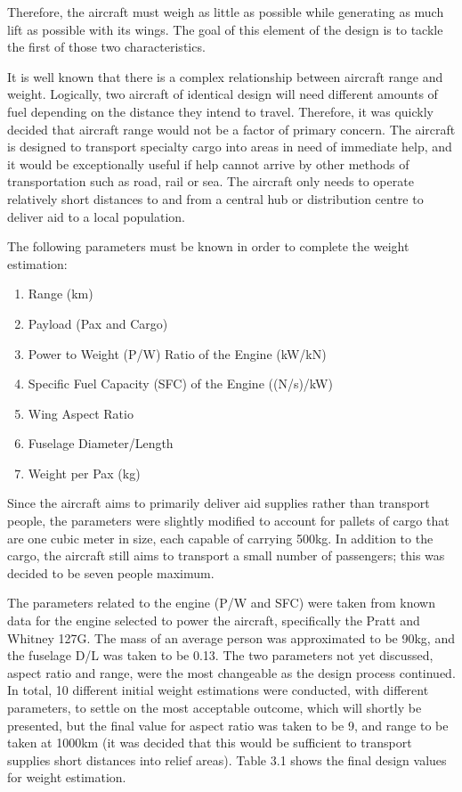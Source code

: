\documentclass[stu, a4paper, 12pt, floatsintext]{apa7}
\numberwithin{figure}{section}
\numberwithin{table}{section}
\numberwithin{equation}{section}
\begin{document}
Therefore, the aircraft must weigh as little as possible while generating as much lift as possible with its wings. The goal of this element of the design is to tackle the first of those two characteristics. 

It is well known that there is a complex relationship between aircraft range and weight. Logically, two aircraft of identical design will need different amounts of fuel depending on the distance they intend to travel. Therefore, it was quickly decided that aircraft range would not be a factor of primary concern. The aircraft is designed to transport specialty cargo into areas in need of immediate help, and it would be exceptionally useful if help cannot arrive by other methods of transportation such as road, rail or sea. The aircraft only needs to operate relatively short distances to and from a central hub or distribution centre to deliver aid to a local population. 

The following parameters must be known in order to complete the weight estimation:
\begin{enumerate}
    \item Range (km)
    \item Payload (Pax and Cargo)
    \item Power to Weight (P/W) Ratio of the Engine (kW/kN)
    \item Specific Fuel Capacity (SFC) of the Engine ((N/s)/kW)
    \item Wing Aspect Ratio
    \item Fuselage Diameter/Length
    \item Weight per Pax (kg)
\end{enumerate}

Since the aircraft aims to primarily deliver aid supplies rather than transport people, the parameters were slightly modified to account for pallets of cargo that are one cubic meter in size, each capable of carrying 500kg. In addition to the cargo, the aircraft still aims to transport a small number of passengers; this was decided to be seven people maximum.

The parameters related to the engine (P/W and SFC) were taken from known data for the engine selected to power the aircraft, specifically the Pratt and Whitney 127G. The mass of an average person was approximated to be 90kg, and the fuselage D/L was taken to be 0.13. The two parameters not yet discussed, aspect ratio and range, were the most changeable as the design process continued. In total, 10 different initial weight estimations were conducted, with different parameters, to settle on the most acceptable outcome, which will shortly be presented, but the final value for aspect ratio was taken to be 9, and range to be taken at 1000km (it was decided that this would be sufficient to transport supplies short distances into relief areas). Table 3.1 shows the final design values for weight estimation. 
\end{document}

